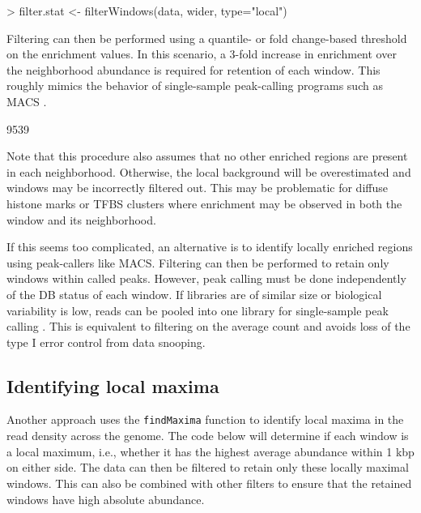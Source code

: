 \documentclass[12pt]{report}
\renewenvironment{Schunk}{\vspace{0pt}}{\vspace{0pt}}
\newcommand{\code}[1]{{\small\texttt{#1}}}
\newcommand{\macs}{MACS}
\begin{document}
\begin{Schunk}
\begin{Sinput}
> filter.stat <- filterWindows(data, wider, type="local")
\end{Sinput}
\end{Schunk}

Filtering can then be performed using a quantile- or fold change-based threshold on the enrichment values. 
In this scenario, a 3-fold increase in enrichment over the neighborhood abundance is required for retention of each window.
This roughly mimics the behavior of single-sample peak-calling programs such as \macs{} \citep{zhang2008}.

\begin{Schunk}
\begin{Soutput}
[1] 9539
\end{Soutput}
\end{Schunk}

Note that this procedure also assumes that no other enriched regions are present in each neighborhood.
Otherwise, the local background will be overestimated and windows may be incorrectly filtered out. 
This may be problematic for diffuse histone marks or TFBS clusters where enrichment may be observed in both the window and its neighborhood.

If this seems too complicated, an alternative is to identify locally enriched regions using peak-callers like \macs{}. 
Filtering can then be performed to retain only windows within called peaks.  
However, peak calling must be done independently of the DB status of each window. 
If libraries are of similar size or biological variability is low, reads can be pooled into one library for single-sample peak calling \citep{lun2014}. 
This is equivalent to filtering on the average count and avoids loss of the type I error control from data snooping.

\subsection{Identifying local maxima}
\label{sec:localmax}
Another approach uses the \code{findMaxima} function to identify local maxima in the read density across the genome.
The code below will determine if each window is a local maximum, i.e., whether it has the highest average abundance within 1 kbp on either side.
The data can then be filtered to retain only these locally maximal windows.
This can also be combined with other filters to ensure that the retained windows have high absolute abundance.
\end{document}
